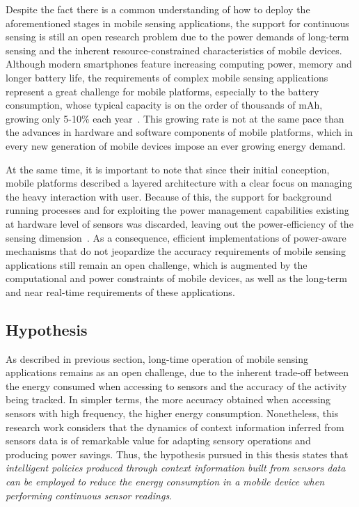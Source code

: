 \documentclass[ENG,PhD]{cinvestav}
\begin{document}
Despite the fact there is a common understanding of how to deploy the aforementioned stages in mobile sensing applications, the support for continuous sensing is still an open research problem due to the power demands of long-term sensing and the inherent resource-constrained characteristics of mobile devices.
Although modern smartphones feature increasing computing power, memory and longer battery life, the requirements of complex mobile sensing applications represent a great challenge for mobile platforms, especially to the battery consumption, whose typical capacity is on the order of thousands of mAh, growing only 5-10\% each year~\cite{Ma2012,Evarts2015}. 
This growing rate is not at the same pace than the advances in hardware and software components of mobile platforms, which in every new generation of mobile devices impose an ever growing energy demand.

At the same time, it is important to note that since their initial conception, mobile platforms described a layered architecture with a clear focus on managing the heavy interaction with user.
Because of this, the support for background running processes and for exploiting the power management capabilities existing at hardware level of sensors was discarded, leaving out the power-efficiency of the sensing dimension~\cite{Priyantha2011}.
As a consequence, efficient implementations of power-aware mechanisms that do not jeopardize the accuracy requirements of mobile sensing applications still remain an open challenge, which is augmented by the computational and power constraints of mobile devices, as well as the long-term and near real-time requirements of these applications.


\subsection{Hypothesis} 
\label{sub:hypothesis}
As described in previous section, long-time operation of mobile sensing applications remains as an open challenge, due to the inherent trade-off between the energy consumed when accessing to sensors and the accuracy of the activity being tracked.
In simpler terms, the more accuracy obtained when accessing sensors with high frequency, the higher energy consumption.
Nonetheless, this research work considers that the dynamics of context information inferred from sensors data is of remarkable value for adapting sensory operations and producing power savings.
Thus, the hypothesis pursued in this thesis states that \emph{intelligent policies produced through context information built from sensors data can be employed to reduce the energy consumption in a mobile device when performing continuous sensor readings}.
\end{document}
